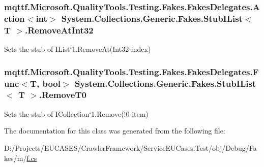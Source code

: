 \hypertarget{class_system_1_1_collections_1_1_generic_1_1_fakes_1_1_stub_i_list_3_01_t_01_4_a5c3c8959720f46fe11da7c0afd7b0fdb}{
\subsubsection[{Remove\-At\-Int32}]{\setlength{\rightskip}{0pt plus 5cm}mqttf.\-Microsoft.\-Quality\-Tools.\-Testing.\-Fakes.\-Fakes\-Delegates.\-Action$<$int$>$ System.\-Collections.\-Generic.\-Fakes.\-Stub\-I\-List$<$ T $>$.Remove\-At\-Int32}}\label{class_system_1_1_collections_1_1_generic_1_1_fakes_1_1_stub_i_list_3_01_t_01_4_a5c3c8959720f46fe11da7c0afd7b0fdb}


Sets the stub of I\-List`1.Remove\-At(\-Int32 index)

\hypertarget{class_system_1_1_collections_1_1_generic_1_1_fakes_1_1_stub_i_list_3_01_t_01_4_a3a5efe199b0d918876348813fa0832cd}{
\subsubsection[{Remove\-T0}]{\setlength{\rightskip}{0pt plus 5cm}mqttf.\-Microsoft.\-Quality\-Tools.\-Testing.\-Fakes.\-Fakes\-Delegates.\-Func$<$T, bool$>$ System.\-Collections.\-Generic.\-Fakes.\-Stub\-I\-List$<$ T $>$.Remove\-T0}}\label{class_system_1_1_collections_1_1_generic_1_1_fakes_1_1_stub_i_list_3_01_t_01_4_a3a5efe199b0d918876348813fa0832cd}


Sets the stub of I\-Collection`1.Remove(!0 item)



The documentation for this class was generated from the following file\-:\begin{DoxyCompactItemize}
\item 
D\-:/\-Projects/\-E\-U\-C\-A\-S\-E\-S/\-Crawler\-Framework/\-Service\-E\-U\-Cases.\-Test/obj/\-Debug/\-Fakes/m/\hyperlink{m_2f_8cs}{f.\-cs}\end{DoxyCompactItemize}
